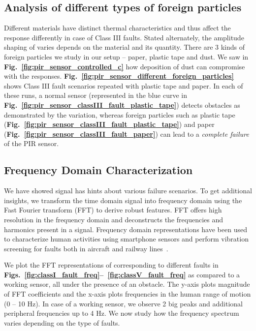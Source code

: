 \subsection{Analysis of different types of foreign particles} \label{subsec:foreign_additional}Different materials have distinct thermal characteristics and thus affect the \aout response differently in case of Class III faults. Stated alternately, the amplitude shaping of \aout varies depends on the material and its quantity. There are 3 kinds of foreign particles we study in our setup -- \ca paper, \cb plastic tape and \cc dust. We saw in {\bfseries Fig.~\ref{fig:pir_sensor_controlled_c}} how deposition of dust can compromise with the \aout responses. {\bfseries Fig.~\ref{fig:pir_sensor_different_foreign_particles}} shows Class III fault scenarios repeated with plastic tape and paper. In each of these runs, a normal sensor (represented in the blue curve in {\bfseries Fig.~\ref{fig:pir_sensor_classIII_fault_plastic_tape}}) detects obstacles as demonstrated by the \aout variation, whereas foreign particles such as plastic tape ({\bfseries Fig.~\ref{fig:pir_sensor_classIII_fault_plastic_tape}}) and paper ({\bfseries Fig.~\ref{fig:pir_sensor_classIII_fault_paper}}) can lead to a \textit{complete failure} of the PIR sensor.

\subsection{Frequency Domain Characterization} \label{subsec:freq_char} %
We have showed \aout signal has hints about various failure scenarios. %
To get additional insights, we transform the time domain \aout signal into frequency domain using the Fast Fourier transform (FFT) to derive robust features. FFT offers high resolution in the frequency domain and deconstructs the frequencies and harmonics present in a signal. Frequency domain representations have been used to characterize human activities using smartphone sensors and perform vibration screening for faults both in aircraft and railway lines~\cite{anguita2013public, HanlyWhy}.

We plot the FFT representations of \aout corresponding to different faults in {\bfseries Figs.~\ref{fig:classI_fault_freq}--~\ref{fig:classV_fault_freq}} as compared to a working sensor, all under the presence of an obstacle. The y-axis plots magnitude of FFT coefficients and the x-axis plots frequencies in the human range of motion (0 -- 10 Hz). In case of a working sensor, we observe 2 big peaks and additional peripheral frequencies up to 4 Hz. We now study how the frequency spectrum varies depending on the type of faults.

